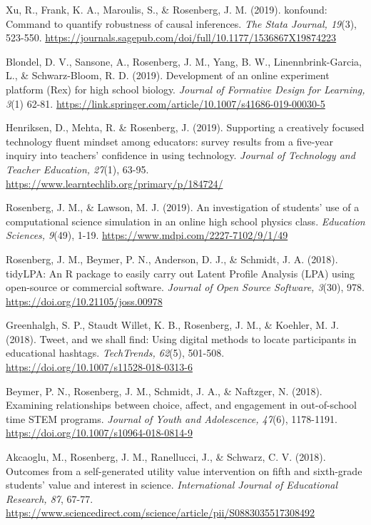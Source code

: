 \documentclass[14,]{article}
\begin{document}
Xu, R., Frank, K. A., Maroulis, S., \& Rosenberg, J. M. (2019).
konfound: Command to quantify robustness of causal inferences. \emph{The
Stata Journal, 19}(3), 523-550.
\url{https://journals.sagepub.com/doi/full/10.1177/1536867X19874223}

Blondel, D. V., Sansone, A., Rosenberg, J. M., Yang, B. W.,
Linennbrink-Garcia, L., \& Schwarz-Bloom, R. D. (2019). Development of
an online experiment platform (Rex) for high school biology.
\emph{Journal of Formative Design for Learning, 3}(1) 62-81.
\url{https://link.springer.com/article/10.1007/s41686-019-00030-5}

Henriksen, D., Mehta, R. \& Rosenberg, J. (2019). Supporting a
creatively focused technology fluent mindset among educators: survey
results from a five-year inquiry into teachers' confidence in using
technology. \emph{Journal of Technology and Teacher Education, 27}(1),
63-95. \url{https://www.learntechlib.org/primary/p/184724/}

Rosenberg, J. M., \& Lawson, M. J. (2019). An investigation of students'
use of a computational science simulation in an online high school
physics class. \emph{Education Sciences, 9}(49), 1-19.
\url{https://www.mdpi.com/2227-7102/9/1/49}

Rosenberg, J. M., Beymer, P. N., Anderson, D. J., \& Schmidt, J. A.
(2018). tidyLPA: An R package to easily carry out Latent Profile
Analysis (LPA) using open-source or commercial software. \emph{Journal
of Open Source Software, 3}(30), 978.
\url{https://doi.org/10.21105/joss.00978}

Greenhalgh, S. P., Staudt Willet, K. B., Rosenberg, J. M., \& Koehler,
M. J. (2018). Tweet, and we shall find: Using digital methods to locate
participants in educational hashtags. \emph{TechTrends, 62}(5), 501-508.
\url{https://doi.org/10.1007/s11528-018-0313-6}

Beymer, P. N., Rosenberg, J. M., Schmidt, J. A., \& Naftzger, N. (2018).
Examining relationships between choice, affect, and engagement in
out-of-school time STEM programs. \emph{Journal of Youth and
Adolescence, 47}(6), 1178-1191.
\url{https://doi.org/10.1007/s10964-018-0814-9}

Akcaoglu, M., Rosenberg, J. M., Ranellucci, J., \& Schwarz, C. V.
(2018). Outcomes from a self-generated utility value intervention on
fifth and sixth-grade students' value and interest in science.
\emph{International Journal of Educational Research, 87}, 67-77.
\url{https://www.sciencedirect.com/science/article/pii/S0883035517308492}
\end{document}
